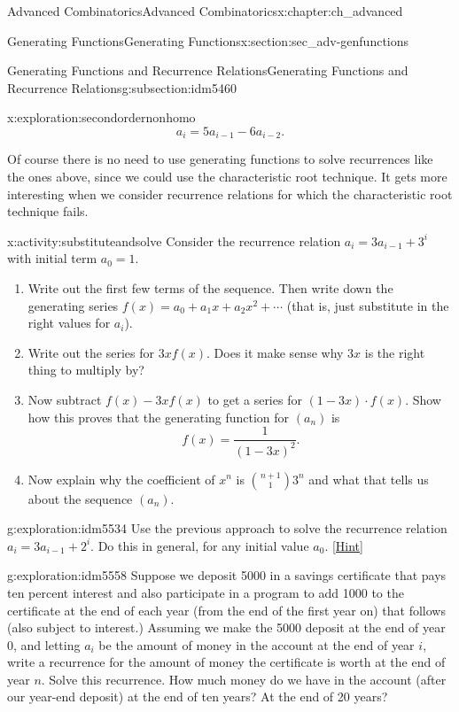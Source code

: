 \documentclass[oneside,10pt,]{book}
\numberwithin{equation}{chapter}
\begin{document}
\begin{chapterptx}{Advanced Combinatorics}{}{Advanced Combinatorics}{}{}{x:chapter:ch_advanced}
\begin{sectionptx}{Generating Functions}{}{Generating Functions}{}{}{x:section:sec_adv-genfunctions}
\begin{subsectionptx}{Generating Functions and Recurrence Relations}{}{Generating Functions and Recurrence Relations}{}{}{g:subsection:idm5460}
\begin{exploration}{}{x:exploration:secondordernonhomo}
\begin{equation*}
a_i=5a_{i-1}-6a_{i-2}\text{.}
\end{equation*}
%
\end{exploration}
Of course there is no need to use generating functions to solve recurrences like the ones above, since we could use the characteristic root technique.  It gets more interesting when we consider recurrence relations for which the characteristic root technique fails.%
\begin{activity}{}{x:activity:substituteandsolve}%
Consider the recurrence relation \(a_i=3a_{i-1} + 3^i\) with initial term \(a_0 = 1\).%
\begin{enumerate}[font=\bfseries,label=(\alph*),ref=\alph*]
\item{}Write out the first few terms of the sequence.  Then write down the generating series \(f(x) = a_0 + a_1x + a_2x^2 + \cdots\) (that is, just substitute in the right values for \(a_i\)). %
\item{}Write out the series for \(3x f(x)\).  Does it make sense why \(3x\) is the right thing to multiply by?%
\item{}Now subtract \(f(x) - 3xf(x)\) to get a series for \((1-3x)\cdot f(x)\).  Show how this proves that the generating function for \((a_n)\) is%
\begin{equation*}
f(x) = \frac{1}{(1-3x)^2}\text{.}
\end{equation*}
%
\item{}Now explain why the coefficient of \(x^n\) is \(\binom{n+1}{1}3^n\) and what that tells us about the sequence \((a_n)\).%
\end{enumerate}
\end{activity}
\begin{exploration}{}{g:exploration:idm5534}%
Use the previous approach to solve the recurrence relation \(a_i=3a_{i-1} + 2^i\).  Do this in general, for any initial value \(a_0\).%
\space\hspace*{0pt}\hfill{\tiny\hyperlink{g:hint:idm5539-back}{[Hint]}}\end{exploration}
\begin{exploration}{}{g:exploration:idm5558}%
Suppose we deposit \textdollar{}5000 in a savings certificate that pays ten percent interest and also participate in a program to add \textdollar{}1000 to the certificate at the end of each year (from the end of the first year on) that follows (also subject to interest.) Assuming we make the \textdollar{}5000 deposit at the end of year 0, and letting \(a_i\) be the amount of money in the account at the end of year \(i\), write a recurrence for the amount of money the certificate is worth at the end of year \(n\). Solve this recurrence. How much money do we have in the account (after our year-end deposit) at the end of ten years?  At the end of 20 years?%

\end{exploration}
\end{subsectionptx}
\end{sectionptx}
\end{chapterptx}
\end{document}
